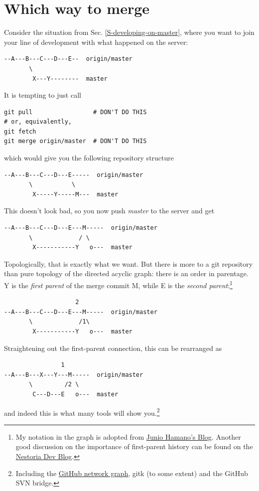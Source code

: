 \documentclass[12pt,pdftex]{article}
\begin{document}
\appendix



\section{Which way to merge}
\label{sec-6}
\label{Section-which-way-to-merge}

Consider the situation from Sec. \ref{S-developing-on-master}, where
you want to join your line of development with what happened on the
server:
\begin{verbatim}
--A---B---C---D---E--  origin/master
       \
        X---Y--------  master
\end{verbatim}

It is tempting to just call
\lstset{frame=single,basicstyle=\ttfamily\footnotesize,language=sh,label= ,caption= ,captionpos=b,numbers=none}
\begin{lstlisting}
git pull                 # DON'T DO THIS
# or, equivalently,
git fetch
git merge origin/master  # DON'T DO THIS
\end{lstlisting}
which would give you the following repository structure
\begin{verbatim}
--A---B---C---D---E-----  origin/master
       \           \
        X-----Y-----M---  master
\end{verbatim}
This doesn't look bad, so you now push \emph{master} to the server and get
\begin{verbatim}
--A---B---C---D---E---M-----  origin/master
       \             / \
        X-----------Y   o---  master
\end{verbatim}

Topologically, that is exactly what we want.
But there is more to a git repository than pure topology of the
directed acyclic graph: there is an order in parentage.
Y is the \emph{first parent} of the merge commit M, while E is the \emph{second
parent}:\footnote{My notation in the graph is adopted from
\href{http://git-blame.blogspot.de/2015/03/fun-with-non-fast-forward.html}{Junio Hamano's Blog}.
Another good discussion on the importance of first-parent history can
be found on the \href{http://devblog.nestoria.com/post/98892582763/maintaining-a-consistent-linear-history-for-git}{Nestoria Dev Blog}.}
\begin{verbatim}
                    2
--A---B---C---D---E---M-----  origin/master
       \             /1\
        X-----------Y   o---  master
\end{verbatim}

Straightening out the first-parent connection, this can be rearranged as
\begin{verbatim}
                1
--A---B---X---Y---M-----  origin/master
       \         /2 \
        C---D---E   o---  master
\end{verbatim}
and indeed this is what many tools will show you.\footnote{Including the \href{https://github.com/pencil-code/pencil-code/network}{GitHub network graph}, gitk (to some extent) and the
GitHub SVN bridge.}
\end{document}
